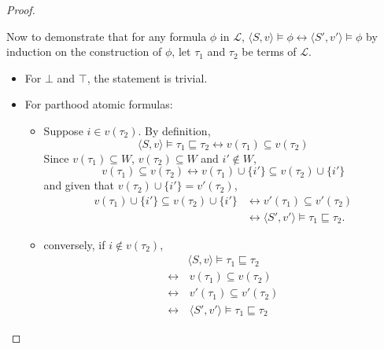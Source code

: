 \documentclass{article}
\newcommand{\lang}{\mathcal{L}}
\newcommand{\lpart}{\sqsubseteq}
\begin{document}
\begin{proof}
\begin{itemize}
\begin{itemize}
    \end{itemize}
\end{itemize}
Now to demonstrate that for any formula $\phi$ in $\lang$, $\langle S, v \rangle \models \phi \leftrightarrow \langle S', v' \rangle \models \phi$ by induction on the construction of $\phi$, let $\tau_1$ and $\tau_2$ be terms of $\lang$.
\begin{itemize}
  \item For $\bot$ and $\top$, the statement is trivial.
  \item For parthood atomic formulas:
    \begin{itemize}
    \item Suppose $i \in v(\tau_2)$. By definition,
      \begin{equation*}
        \langle S, v \rangle \models \tau_1 \lpart \tau_2 \leftrightarrow v(\tau_1) \subseteq v(\tau_2)
      \end{equation*}
      Since $v(\tau_1) \subseteq W$, $v(\tau_2) \subseteq W$ and $i' \not \in W$,
      \begin{equation*}
         v(\tau_1) \subseteq v(\tau_2) \leftrightarrow v(\tau_1) \cup \{i'\} \subseteq v(\tau_2) \cup \{i'\}
      \end{equation*}
      and given that $v(\tau_2) \cup \{i'\} = v'(\tau_2)$,
      \begin{align*}
        v(\tau_1) \cup \{i'\} \subseteq v(\tau_2) \cup \{i'\} &\leftrightarrow v'(\tau_1) \subseteq v'(\tau_2) \\
        &\leftrightarrow \langle S', v' \rangle \models \tau_1 \lpart \tau_2.
      \end{align*}
    \item conversely, if $i \not \in v(\tau_2)$,
      \begin{align*}
        &\langle S, v \rangle \models \tau_1 \lpart \tau_2 \\
        \leftrightarrow&\, v(\tau_1) \subseteq v(\tau_2) \\
        \leftrightarrow&\, v'(\tau_1) \subseteq v'(\tau_2) \\
        \leftrightarrow&\, \langle S', v' \rangle \models \tau_1 \lpart \tau_2
      \end{align*}


\end{itemize}
\end{itemize}
\end{proof}
\end{document}
